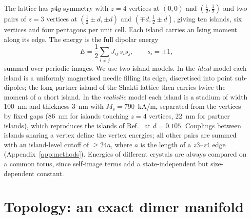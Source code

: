 \documentclass[10pt,twoside]{article}
\begin{document}
The lattice has $p4g$ symmetry with $z=4$ vertices at $(0,0)$ and $(\tfrac12,\tfrac12)$ and two pairs of $z=3$ vertices at $(\tfrac12\pm d,\pm d)$ and $(\mp d,\tfrac12\pm d)$, giving ten islands, six vertices and four pentagons per unit cell. Each island carries an Ising moment along its edge. The energy is the full dipolar energy
\begin{equation}
E=\frac12\sum_{i\neq j}J_{ij}\,s_is_j,\qquad s_i=\pm1,
\label{eq:energy}
\end{equation}
summed over periodic images. We use two island models. In the \emph{ideal} model each island is a uniformly magnetised needle filling its edge, discretised into point sub-dipoles; the long partner island of the Shakti lattice then carries twice the moment of a short island. In the \emph{realistic} model each island is a stadium of width 100~nm and thickness 3~nm with $M_s=790$~kA/m, separated from the vertices by fixed gaps (86~nm for islands touching $z=4$ vertices, 22~nm for partner islands), which reproduces the islands of Ref.~\cite{Saccone2019} at $d=0.105$. Couplings between islands sharing a vertex define the vertex energies; all other pairs are summed with an island-level cutoff of $\geq24a$, where $a$ is the length of a $z3$--$z4$ edge (Appendix~\ref{app:methods}). Energies of different crystals are always compared on a common torus, since self-image terms add a state-independent but size-dependent constant.

\section{Topology: an exact dimer manifold}
\end{document}
